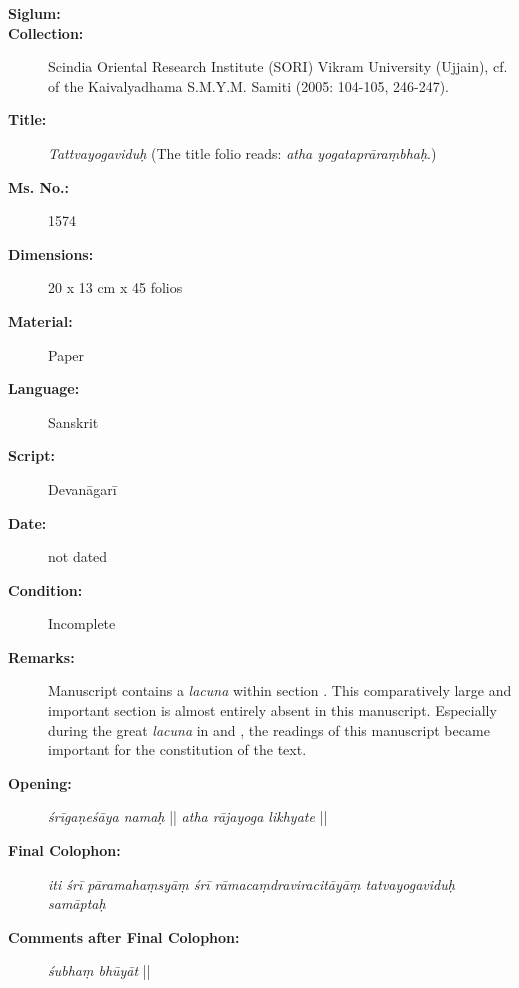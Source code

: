 \begin{description}
\item[\textbf{Siglum:}] \Huge{} \nocite{ytbu1}
\item[\textbf{Collection:}] Scindia Oriental Research Institute (SORI) Vikram University (Ujjain), cf.  of the Kaivalyadhama S.M.Y.M. Samiti (2005: 104-105, 246-247). 
\item[\textbf{Title:}] \emph{Tattvayogaviduḥ} (The title folio reads: \textit{atha yogataprāraṃbhaḥ}.)
\item[\textbf{Ms. No.:}] 1574
\item[\textbf{Dimensions:}] 20 x 13 cm x 45 folios   
\item[\textbf{Material:}] Paper
\item[\textbf{Language:}] Sanskrit
\item[\textbf{Script:}] Devanāgarī
\item[\textbf{Date:}] not dated 
\item[\textbf{Condition:}] Incomplete
\item[\textbf{Remarks:}] Manuscript  contains a \textit{lacuna} within section . This comparatively large and important section is almost entirely absent in this manuscript. Especially during the great \textit{lacuna} in  and , the readings of this manuscript became important for the constitution of the text.     
\item[\textbf{Opening:}] \textit{śrīgaṇeśāya namaḥ} || \textit{atha rājayoga likhyate} ||     
\item[\textbf{Final Colophon:}] \textit{iti śrī pāramahaṃsyāṃ śrī rāmacaṃdraviracitāyāṃ tatvayogaviduḥ samāptaḥ} 
\item[\textbf{Comments after Final Colophon:}] \textit{śubhaṃ bhūyāt} ||
\end{description}
\newpage
